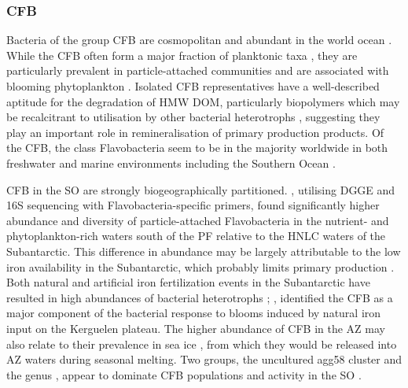 \subsubsection{CFB}

Bacteria of the group \ac{CFB} are cosmopolitan and abundant in the world ocean \cite{Glockner:1999vm}.
While the \ac{CFB} often form a major fraction of planktonic taxa \cite{Fandino:2001uw}, they are particularly prevalent in particle-attached communities \cite{DeLong:1993uu} and are associated with blooming phytoplankton \cite{Pinhassi:2004is}.
Isolated \ac{CFB} representatives have a well-described aptitude for the degradation of \ac{HMW} \ac{DOM}, particularly biopolymers which may be recalcitrant to utilisation by other bacterial heterotrophs \citep[reviewed in][]{Kirchman:2002ub}, suggesting they play an important role in remineralisation of primary production products.
Of the \ac{CFB}, the class Flavobacteria seem to be in the majority worldwide in both freshwater and marine environments \cite{OSullivan:2006km,Cottrell:2005bo} including the Southern Ocean \cite{Abell:2005ji}.

\ac{CFB} in the \ac{SO} are strongly biogeographically partitioned.
\citet{Abell:2005ji}, utilising \ac{DGGE} and 16S sequencing with Flavobacteria-specific primers, found significantly higher abundance and diversity of particle-attached Flavobacteria in the nutrient- and phytoplankton-rich waters south of the \ac{PF} relative to the \ac{HNLC} waters of the Subantarctic.
This difference in abundance may be largely attributable to the low iron availability in the Subantarctic, which probably limits primary production \cite{Boyd:2007ij}.
Both natural and artificial iron fertilization events in the Subantarctic have resulted in high abundances of bacterial heterotrophs \cite{Christaki:2008el,Oliver:2004ty}; \citet{West:2008kc}, identified the \ac{CFB} as a major component of the bacterial response to blooms induced by natural iron input on the Kerguelen plateau.
The higher abundance of \ac{CFB} in the \ac{AZ} may also relate to their prevalence in sea ice \cite{Brinkmeyer:2003iq,Brown:2001hh}, from which they would be released into \ac{AZ} waters during seasonal melting.
Two groups, the uncultured agg58 cluster and the genus , appear to dominate \ac{CFB} populations and activity in the \ac{SO} \cite{Murray:2007db,Abell:2005ji,Abell:dh,Obernosterer:2011df,West:2008kc,Ghiglione:2011ee,Ducklow:2011jl,Straza:2010io}.


